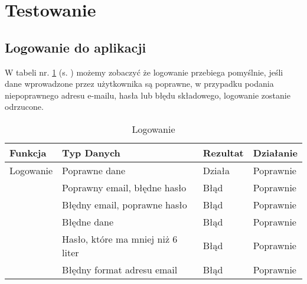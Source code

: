 \newpage
\section{Testowanie}	%

\subsection{Logowanie do aplikacji}
W tabeli nr. \ref{tab:tabelka001} (s. \pageref{tab:tabelka001}) możemy zobaczyć że logowanie przebiega pomyślnie, jeśli dane wprowadzone przez użytkownika są poprawne, w przypadku podania niepoprawnego adresu e-mailu, hasła lub błędu składowego, logowanie zostanie odrzucone.
\begin{table}[h!]
	\centering
	\begin{tabularx}{\textwidth}{|X|>{\arraybackslash}m{}|X|X|}
		\hline
		\textbf{Funkcja} & \textbf{Typ Danych}               & \textbf{Rezultat} & \textbf{Działanie} \\ \hline
		Logowanie        & Poprawne dane                     & Działa            & Poprawnie          \\ \hline
		                 & Poprawny email, błędne hasło      & Błąd              & Poprawnie          \\ \hline
		                 & Błędny email, poprawne hasło      & Błąd              & Poprawnie          \\ \hline
		                 & Błędne dane                       & Błąd              & Poprawnie          \\ \hline
		                 & Hasło, które ma mniej niż 6 liter & Błąd              & Poprawnie          \\ \hline
		                 & Błędny format adresu email        & Błąd              & Poprawnie          \\ \hline
	\end{tabularx}
	\caption{Logowanie}
	\label{tab:tabelka001}
\end{table}


